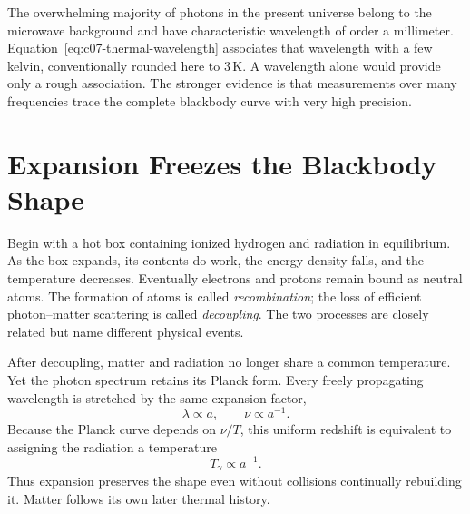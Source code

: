 The overwhelming majority of photons in the present universe belong to the microwave background and have characteristic wavelength of order a millimeter. Equation~\eqref{eq:c07-thermal-wavelength} associates that wavelength with a few kelvin, conventionally rounded here to \(3\,\mathrm{K}\). A wavelength alone would provide only a rough association. The stronger evidence is that measurements over many frequencies trace the complete blackbody curve with very high precision.

\begin{classroomqa}
\end{classroomqa}

\section{Expansion Freezes the Blackbody Shape}

Begin with a hot box containing ionized hydrogen and radiation in equilibrium. As the box expands, its contents do work, the energy density falls, and the temperature decreases. Eventually electrons and protons remain bound as neutral atoms. The formation of atoms is called \emph{recombination}; the loss of efficient photon--matter scattering is called \emph{decoupling}. The two processes are closely related but name different physical events.

After decoupling, matter and radiation no longer share a common temperature. Yet the photon spectrum retains its Planck form. Every freely propagating wavelength is stretched by the same expansion factor,
\begin{equation}
\lambda\propto a,
\qquad
\nu\propto a^{-1}.
\end{equation}
Because the Planck curve depends on \(\nu/T\), this uniform redshift is equivalent to assigning the radiation a temperature
\begin{equation}
\boxed{T_\gamma\propto a^{-1}.}
\label{eq:c07-temperature-scaling}
\end{equation}
Thus expansion preserves the shape even without collisions continually rebuilding it. Matter follows its own later thermal history.

